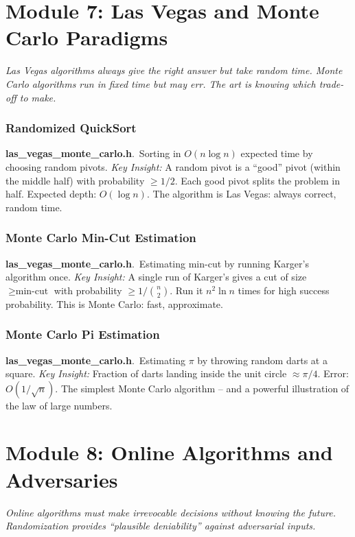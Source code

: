 \documentclass[11pt,a4paper]{article}
\newcommand{\algo}[2]{\textbf{#1}.\ #2}
\newcommand{\insight}{\textit{Key Insight: }}
\begin{document}
\section{Module 7: Las Vegas and Monte Carlo Paradigms}
\label{sec:lvmc}

\textit{Las Vegas algorithms always give the right answer but take random time. Monte Carlo algorithms run in fixed time but may err. The art is knowing which trade-off to make.}

\subsubsection{Randomized QuickSort}
\algo{las\_vegas\_monte\_carlo.h}{Sorting in \(O(n \log n)\) expected time by choosing random pivots.}
\insight A random pivot is a ``good'' pivot (within the middle half) with probability \(\ge 1/2\). Each good pivot splits the problem in half. Expected depth: \(O(\log n)\). The algorithm is Las Vegas: always correct, random time.

\subsubsection{Monte Carlo Min-Cut Estimation}
\algo{las\_vegas\_monte\_carlo.h}{Estimating min-cut by running Karger's algorithm once.}
\insight A single run of Karger's gives a cut of size \(\ge \text{min-cut}\) with probability \(\ge 1/\binom{n}{2}\). Run it \(n^2 \ln n\) times for high success probability. This is Monte Carlo: fast, approximate.

\subsubsection{Monte Carlo Pi Estimation}
\algo{las\_vegas\_monte\_carlo.h}{Estimating \(\pi\) by throwing random darts at a square.}
\insight Fraction of darts landing inside the unit circle \(\approx \pi/4\). Error: \(O(1/\sqrt{n})\). The simplest Monte Carlo algorithm -- and a powerful illustration of the law of large numbers.

\section{Module 8: Online Algorithms and Adversaries}
\label{sec:online}

\textit{Online algorithms must make irrevocable decisions without knowing the future. Randomization provides ``plausible deniability'' against adversarial inputs.}
\end{document}
